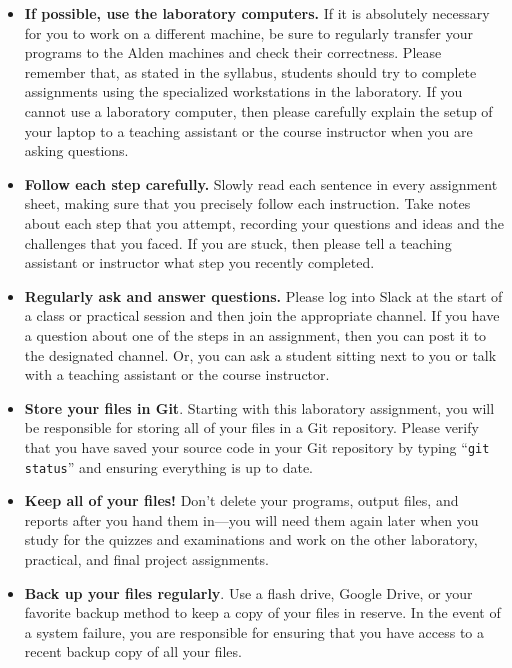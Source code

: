 \vspace*{-.1in}
\begin{itemize}
  \setlength{\itemsep}{-.01in}

\item {\bf If possible, use the laboratory computers.} If it is absolutely necessary for you to work on a different
  machine, be sure to regularly transfer your programs to the Alden machines and check their correctness. Please
  remember that, as stated in the syllabus, students should try to complete assignments using the specialized
  workstations in the laboratory. If you cannot use a laboratory computer, then please carefully explain the setup of
  your laptop to a teaching assistant or the course instructor when you are asking questions.

\item {\bf Follow each step carefully.} Slowly read each sentence in every assignment sheet, making sure that you
  precisely follow each instruction. Take notes about each step that you attempt, recording your questions and ideas
  and the challenges that you faced. If you are stuck, then please tell a teaching assistant or instructor what step
  you recently completed.

\item {\bf Regularly ask and answer questions.} Please log into Slack at the start of a class or practical session and
  then join the appropriate channel. If you have a question about one of the steps in an assignment, then you can post
  it to the designated channel. Or, you can ask a student sitting next to you or talk with a teaching assistant or the
  course instructor.

\item {\bf Store your files in Git}. Starting with this laboratory assignment, you will be responsible for storing all
  of your files in a Git repository. Please verify that you have saved your source code in your Git repository by
  typing ``{\tt git status}'' and ensuring everything is up to date.

\item {\bf Keep all of your files!} Don't delete your programs, output files, and reports after you hand them in---you
  will need them again later when you study for the quizzes and examinations and work on the other laboratory,
  practical, and final project assignments.

\item {\bf Back up your files regularly}. Use a flash drive, Google Drive, or your favorite backup method to keep a
  copy of your files in reserve. In the event of a system failure, you are responsible for ensuring that you have
  access to a recent backup copy of all your files.

\end{itemize}

